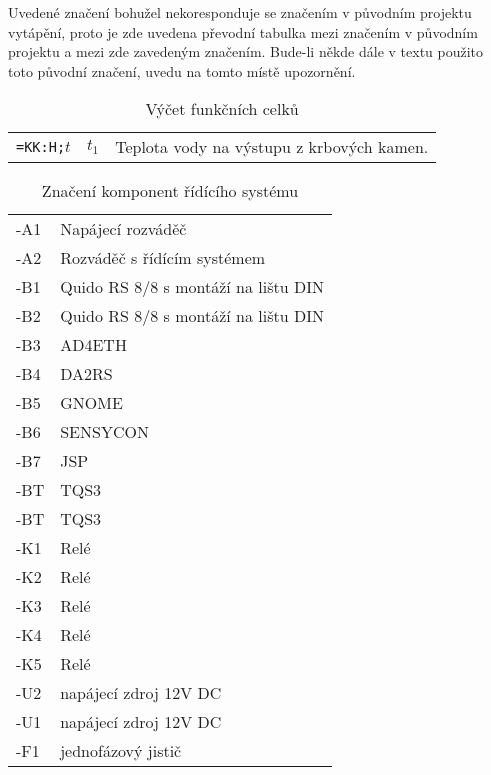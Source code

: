 \documentclass[a4paper,draft]{book}
\begin{document}
    Uvedené značení bohužel nekoresponduje se značením v původním projektu
    vytápění, proto je zde uvedena převodní tabulka mezi značením v původním
    projektu a mezi zde zavedeným značením. Bude-li někde dále v textu
    použito toto původní značení, uvedu na tomto místě upozornění.

    \begin{table}[]
        \centering
        \begin{tabular}{ l l l}
            \texttt{=KK:H;}$t$\index{$t_1$|see {=KK:H;t}} & $t_1$ & Teplota vody na výstupu z krbových kamen.
        \end{tabular}
        \caption{Výčet funkčních celků}
        \label{tab:myfirsttable}
    \end{table}


\begin{table}[]
  \centering
    \begin{tabular}{l l}
      -A1 & Napájecí rozváděč\\
      -A2 & Rozváděč s řídícím systémem\\
      -B1 & Quido RS 8/8 s montáží na lištu DIN\\
      -B2 & Quido RS 8/8 s montáží na lištu DIN\\
      -B3 & AD4ETH\\
      -B4 & DA2RS\\
      -B5 & GNOME\\
      -B6 & SENSYCON\\
      -B7 & JSP\\
      -BT & TQS3\\
      -BT & TQS3\\
      -K1 & Relé\\
      -K2 & Relé\\
      -K3 & Relé\\
      -K4 & Relé\\
      -K5 & Relé\\
      -U2 & napájecí zdroj 12V DC\\
      -U1 & napájecí zdroj 12V DC\\
      -F1 & jednofázový jistič
    \end{tabular}
  \caption{Značení komponent řídícího systému}
  \label{tab:CSLabels}
\end{table}
\end{document}
